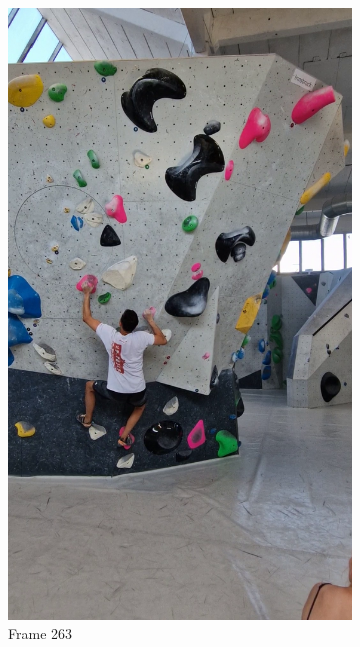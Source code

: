 \documentclass[./main.tex]{subfiles}
\begin{document}
\begin{figure}[htbp]
    \begin{subfigure}{0.3\textwidth}
        \centering
        \includegraphics[width=\textwidth]{entities/CA_263.png}
        \caption{Frame 263}
    \end{subfigure}
    \begin{subfigure}{0.3\textwidth}
        \centering

\end{subfigure}
\end{figure}
\end{document}
